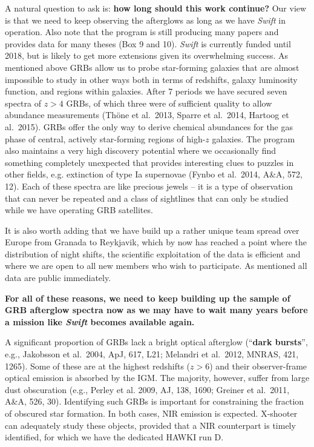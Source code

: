 \documentclass[iop, twocolappendix, numberedappendix, tighten, appendixfloats]{emulateapj}
\begin{document}
	\vspace{0.2cm}
	A natural question to ask is: {\bf how long should this work continue?} Our
	view is that we need to keep observing the afterglows as long as we have
	\textit{Swift} in operation. Also note that the program is still producing many 
	papers and provides data for many theses (Box 9 and 10). \textit{Swift} is currently 
	funded until 2018, but is likely to get more extensions given its overwhelming 
	success. As
	mentioned above GRBs allow us to probe star-forming galaxies that are almost
	impossible to study in other ways both in terms of redshifts, galaxy luminosity
	function, and regions within galaxies. After 7 periods we have 
	secured seven spectra of $z>4$ GRBs, of which three were of sufficient quality to
	allow abundance measurements (Th\"one et al.\ 2013, Sparre et al.\ 2014, 
	Hartoog et al.\ 2015). GRBs offer the only way to derive chemical abundances 
	for the gas phase of central, actively star-forming regions of high-$z$ galaxies. 
	The program also maintains a very high discovery
	potential where we occasionally find something completely unexpected that 
	provides interesting clues to puzzles in other fields, e.g. extinction of 
	type Ia supernovae (Fynbo et al.\ 2014, A\&A, 572, 12). Each of these spectra are like
	precious jewels – it is a type of observation that can never be repeated and a
	class of sightlines that can only be studied while we have operating GRB
	satellites. 
	
	It is also worth adding that we have build up a rather unique team spread over
	Europe from Granada to Reykjavik, which by now has reached a point where the 
	distribution of night shifts, the scientific exploitation of the data is 
	efficient and where we are open to all new members who wish to participate.
	As mentioned all data are public immediately.
	
	{\bf For all of these reasons, we need to keep
		building up the sample of GRB afterglow spectra now as we may have to wait many
		years before a mission like \textit{Swift} becomes available again.}
	
	A significant proportion of GRBs lack a bright optical afterglow (``{\bf dark bursts}'', e.g.,
	Jakobsson et al.\ 2004, ApJ, 617, L21; Melandri et al.\ 2012, MNRAS, 421, 1265). 
	Some of these are at the highest
	redshifts ($z > 6$) and their observer-frame optical emission is absorbed by
	the IGM. The majority, however, suffer from large dust obscuration (e.g., Perley
	et al. 2009, AJ, 138, 1690; Greiner et al.\ 2011, A\&A, 526, 30).
	Identifying such GRBs is important for
	constraining the fraction of obscured star formation. In both cases,
	NIR emission is
	expected. X-shooter
	can adequately study these objects, provided that a NIR counterpart is timely
	identified, for which we have the dedicated HAWKI run D. 
	
\end{document}
